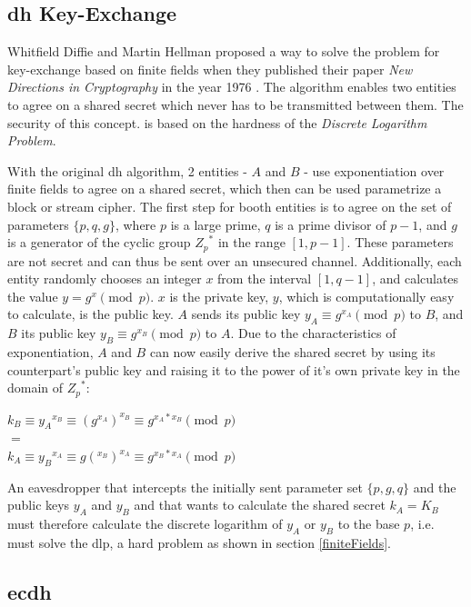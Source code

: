 \subsection{\gls{dh} Key-Exchange}

Whitfield Diffie and Martin Hellman proposed a way to solve the problem for key-exchange based on finite fields
when they published their paper \textit{New Directions in Cryptography} in the year 1976 \cite{1055638}. The algorithm enables two entities to agree on a 
shared secret which never has to be transmitted between them. The security of this concept.
is based on the hardness of the \textit{Discrete Logarithm Problem}.

With the original \gls{dh} algorithm, 2 entities - $A$ and $B$ - use exponentiation over finite fields to agree on a shared secret, which
then can be used parametrize a block or stream cipher. The first step for booth entities is to agree on the set of parameters $\{p, q, g\}$, where $p$ is a 
large prime, $q$ is a prime divisor of $p-1$, and $g$ is a generator of the cyclic group ${Z_p}^*$ in the range $[1, p-1]$. These parameters are not secret and
can thus be sent over an unsecured channel.
Additionally, each entity randomly chooses an integer $x$ from the interval $[1, q-1]$, and calculates the value $y = g^x \pmod p$. $x$ is the private key,
$y$, which is computationally easy to calculate, is the public key. $A$ sends its public key $y_A \equiv g^{x_A} \pmod p$ to $B$, and $B$ its public key
$y_B \equiv g^{x_B} \pmod p$ to $A$. Due to the characteristics of exponentiation, $A$ and $B$ can now easily derive the shared secret by using its counterpart's
public key and raising it to the power of it's own private key in the domain of ${Z_p}^*$:

\begin{center}
 $k_B \equiv {y_A}^{x_B} \equiv (g^{x_A})^{x_B} \equiv g^{x_A*x_B} \pmod p $\\
 $ = $ \\
 $ k_A \equiv {y_B}^{x_A} \equiv g(^{x_B})^{x_A} \equiv g^{x_B*x_A} \pmod p $
\end{center}
An eavesdropper that intercepts the initially sent parameter set $\{p, g, q\}$ and the public keys $y_A$ and $y_B$ and that wants to calculate the shared secret
$k_A = K_B$  must therefore calculate the discrete logarithm of $y_A$ or $y_B$ to the base $p$, i.e. must solve the \gls{dlp}, a hard problem as shown in
section \ref{finiteFields}.

\subsection{\gls{ecdh}}


